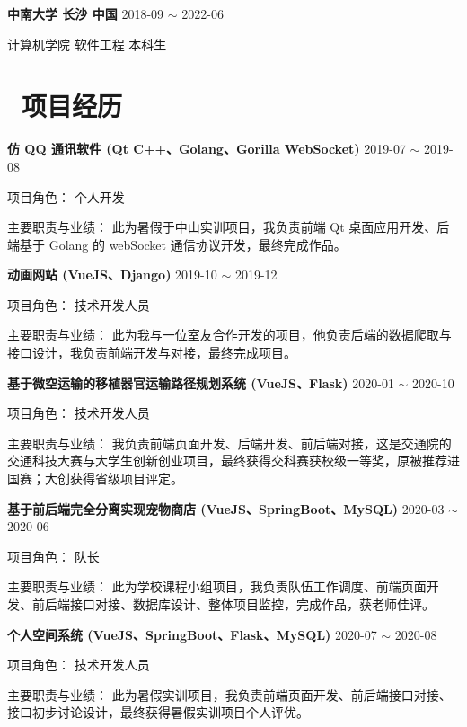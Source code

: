 \documentclass[11pt, a4paper]{article}
\begin{document}
\textbf{中南大学 \quad 长沙 \quad 中国} \hfill 2018-09 $\sim$ 2022-06

计算机学院 \quad 软件工程 \quad 本科生

\section{\color{CVBlue}\faUsers\ 项目经历}

\textbf{仿 QQ 通讯软件 (Qt C++、Golang、Gorilla WebSocket)} \hfill 2019-07 $\sim$ 2019-08

项目角色： \quad 个人开发

主要职责与业绩： \quad 此为暑假于中山实训项目，我负责前端 Qt 桌面应用开发、后端基于 Golang 的 webSocket 通信协议开发，最终完成作品。




\textbf{动画网站 (VueJS、Django)} \hfill 2019-10 $\sim$ 2019-12

项目角色： \quad 技术开发人员

主要职责与业绩： \quad 此为我与一位室友合作开发的项目，他负责后端的数据爬取与接口设计，我负责前端开发与对接，最终完成项目。

\textbf{基于微空运输的移植器官运输路径规划系统 (VueJS、Flask)} \hfill 2020-01 $\sim$ 2020-10

项目角色： \quad 技术开发人员

主要职责与业绩： \quad 我负责前端页面开发、后端开发、前后端对接，这是交通院的交通科技大赛与大学生创新创业项目，最终获得交科赛获校级一等奖，原被推荐进国赛；大创获得省级项目评定。

\textbf{基于前后端完全分离实现宠物商店 (VueJS、SpringBoot、MySQL)} \hfill 2020-03 $\sim$ 2020-06

项目角色： \quad 队长

主要职责与业绩： \quad 此为学校课程小组项目，我负责队伍工作调度、前端页面开发、前后端接口对接、数据库设计、整体项目监控，完成作品，获老师佳评。

\textbf{个人空间系统 (VueJS、SpringBoot、Flask、MySQL)} \hfill 2020-07 $\sim$ 2020-08

项目角色： \quad 技术开发人员

主要职责与业绩： \quad 此为暑假实训项目，我负责前端页面开发、前后端接口对接、接口初步讨论设计，最终获得暑假实训项目个人评优。
\end{document}
